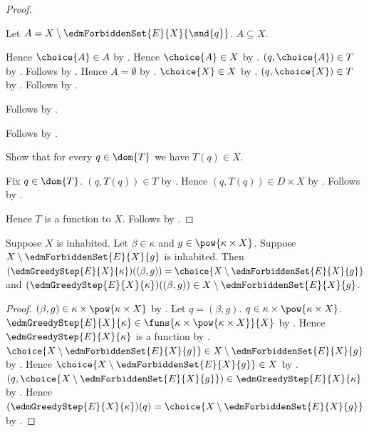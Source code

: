\begin{proof}
\begin{subproof}
\begin{subproof}
\begin{subproof}
                Let $A=X\setminus
                    \edmForbiddenSet{E}{X}{\snd{q}}$.
                $A\subseteq X$.
                \begin{byCase}
                        Hence $\choice{A}\in A$ by .
                        Hence $\choice{A}\in X$ by .
                        $(q,\choice{A})\in T$ by
                            .
                        Follows by .
                        Hence $A=\emptyset$ by
                            .
                        $\choice{X}\in X$ by .
                        $(q,\choice{X})\in T$ by
                            .
                        Follows by .
                \end{byCase}
            \end{subproof}
            Follows by .
        \end{subproof}
        Follows by .
    \end{subproof}
    Show that for every $q\in\dom{T}$ we have $T(q)\in X$.
    \begin{subproof}
        Fix $q\in\dom{T}$.
        $(q,T(q))\in T$ by .
        Hence $(q,T(q))\in D\times X$ by .
        Follows by .
    \end{subproof}
    Hence $T$ is a function to $X$.
    Follows by .
\end{proof}

\begin{proposition}\label{edm_greedy_step_available}
    Suppose $X$ is inhabited.
    Let $\beta\in\kappa$ and
        $g\in\pow{\kappa\times X}$.
    Suppose $X\setminus\edmForbiddenSet{E}{X}{g}$ is inhabited.
    Then $(\edmGreedyStep{E}{X}{\kappa})((\beta,g))
        =\choice{X\setminus\edmForbiddenSet{E}{X}{g}}$ and
        $(\edmGreedyStep{E}{X}{\kappa})((\beta,g))
            \in X\setminus\edmForbiddenSet{E}{X}{g}$.
\end{proposition}
\begin{proof}
    $(\beta,g)\in\kappa\times\pow{\kappa\times X}$ by
        .
    Let $q=(\beta,g)$.
    $q\in\kappa\times\pow{\kappa\times X}$.
    $\edmGreedyStep{E}{X}{\kappa}
        \in\funs{\kappa\times\pow{\kappa\times X}}{X}$ by
        .
    Hence $\edmGreedyStep{E}{X}{\kappa}$ is a function by
        .
    $\choice{X\setminus\edmForbiddenSet{E}{X}{g}}
        \in X\setminus\edmForbiddenSet{E}{X}{g}$ by .
    Hence $\choice{X\setminus\edmForbiddenSet{E}{X}{g}}\in X$ by
        .
    $(q,\choice{X\setminus\edmForbiddenSet{E}{X}{g}})
        \in\edmGreedyStep{E}{X}{\kappa}$ by
        .
    Hence $(\edmGreedyStep{E}{X}{\kappa})(q)
        =\choice{X\setminus\edmForbiddenSet{E}{X}{g}}$ by
        .
\end{proof}

